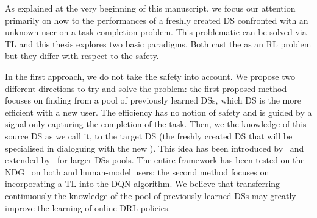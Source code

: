 As explained at the very beginning of this manuscript, we focus our attention primarily on how to  the performances of a freshly created \gls{DS} confronted with an unknown user on a task-completion problem. This problematic can be solved via \gls{TL} and this thesis explores two basic paradigms. Both cast the  as an \gls{RL} problem but they differ with respect to the safety.

In the first approach, we do not take the safety into account.
We propose two different directions to try and solve the problem: 
%
the first proposed method focuses on finding from a pool of previously learned \glspl{DS}, which \gls{DS} is the more efficient with a new user. The efficiency has no notion of safety and is guided by a signal only capturing the completion of the task. Then, we  the knowledge of this source \gls{DS} as we call it, to the target \gls{DS} (the freshly created \gls{DS} that will be specialised in dialoguing with the new ). This idea has been introduced by~\textcite{Genevay2016} and extended by~\textcite{carrara2017online} for larger \glspl{DS} pools. The entire framework has been tested on the \gls{NDG}~\parencite{Laroche2016} on both  and human-model users; the second method focuses on incorporating a \gls{TL} into the \gls{DQN} algorithm. We believe that transferring continuously the knowledge of the pool of previously learned \glspl{DS} may greatly improve the learning of online \gls{DRL} policies. %

